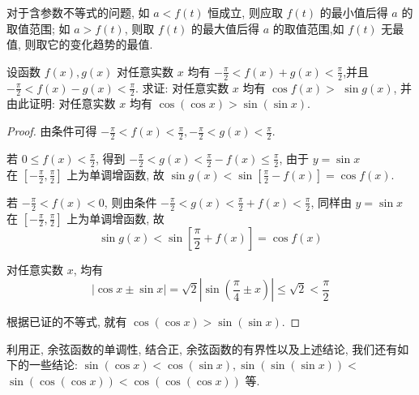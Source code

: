 \begin{note}
	对于含参数不等式的问题, 如 $a<f(t)$ 恒成立, 则应取 $f(t)$ 的最小值后得 $a$ 的取值范围; 如 $a>f(t)$, 则取 $f(t)$ 的最大值后得 $a$ 的取值范围,如 $f(t)$ 无最值, 则取它的变化趋势的最值.
\end{note}

\begin{example}
	设函数 $f(x), g(x)$ 对任意实数 $x$ 均有 $-\frac{\pi}{2}<f(x)+g(x)<\frac{\pi}{2}$,并且 $-\frac{\pi}{2}<f(x)-g(x)<\frac{\pi}{2}$. 求证: 对任意实数 $x$ 均有 $\cos f(x)>$ $\sin g(x)$, 并由此证明: 对任意实数 $x$ 均有 $\cos (\cos x)>\sin (\sin x)$.
\end{example}
\begin{proof}
	由条件可得 $-\frac{\pi}{2}<f(x)<\frac{\pi}{2},-\frac{\pi}{2}<g(x)<\frac{\pi}{2}$.

	若 $0 \leqslant f(x)<\frac{\pi}{2}$, 得到 $-\frac{\pi}{2}<g(x)<\frac{\pi}{2}-f(x) \leqslant \frac{\pi}{2}$, 由于 $y=\sin x$\\
	在 $\left[-\frac{\pi}{2}, \frac{\pi}{2}\right]$ 上为单调增函数, 故 $\sin g(x)<\sin \left[\frac{\pi}{2}-f(x)\right]=\cos f(x)$.

	若 $-\frac{\pi}{2}<f(x)<0$, 则由条件 $-\frac{\pi}{2}<g(x)<\frac{\pi}{2}+f(x)<\frac{\pi}{2}$, 同样由 $y=\sin x$ 在 $\left[-\frac{\pi}{2}, \frac{\pi}{2}\right]$ 上为单调增函数, 故
	$$
		\sin g(x)<\sin \left[\frac{\pi}{2}+f(x)\right]=\cos f(x)
	$$

	对任意实数 $x$, 均有
	$$
		|\cos x \pm \sin x|=\sqrt{2}\left|\sin \left(\frac{\pi}{4} \pm x\right)\right| \leqslant \sqrt{2}<\frac{\pi}{2}
	$$

	根据已证的不等式, 就有 $\cos (\cos x)>\sin (\sin x)$.
\end{proof}
\begin{note}
	利用正, 余弦函数的单调性, 结合正, 余弦函数的有界性以及上述结论, 我们还有如下的一些结论: $\sin (\cos x)<\cos (\sin x), \sin (\sin (\sin x))<$ $\sin (\cos (\cos x))<\cos (\cos (\cos x))$ 等.
\end{note}

